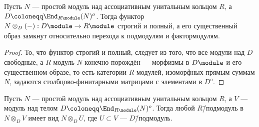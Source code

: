 \documentclass[
	extrafontsizes,
	11pt,
	hyphens,
]{memoir}
\begin{document}


\begin{theorem}
\label{thm:TensorSimpleEnd}
Пусть \(N\) --- простой модуль над ассоциативным унитальным кольцом \(R\), а \(D \coloneqq \End_{R\module}(N)^o\).
Тогда функтор \(N \otimes_D (-) : D\module \to R\module\) строгий и полный, а его существенный образ замкнут относительно перехода к подмодулям и фактормодулям.
\end{theorem}

\begin{proof}
То, что функтор строгий и полный, следует из того, что все модули над \(D\) свободные, а \(R\)-мо\-дуль \(N\) конечно порождён --- морфизмы в \(D\module\) и его существенном образе,
то есть категории \(R\)-мо\-ду\-лей, изоморфных прямым суммам \(N\),
задаются столбцово-финитарными матрицами с элементами в \(D^o\).
\end{proof}

\begin{corollary}
Пусть \(N\) --- простой модуль над ассоциативным унитальным кольцом \(R\), а \(V\) --- модуль над телом \(D \coloneqq \End_{R\module}(N)^o\).%
\label{cor:SimpleTensorSubmod}
Тогда любой \(R\)\=/подмодуль в \(N \otimes_D V\) имеет вид \(N \otimes_D U\), где \(U \subset V\) --- \(D\)\=/подмодуль.
\end{corollary}

\end{document}
